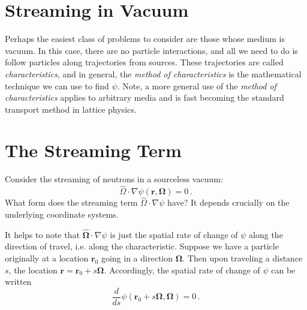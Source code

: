 \section*{Streaming in Vacuum}

Perhaps the easiest class of problems to consider are those whose medium is vacuum.  In this case, there are no particle interactions, and all we need to do is follow particles along trajectories from sources.  These trajectories are called \textit{characteristics}, and in general, the \textit{method of characteristics} is the mathematical technique we can use to find $\psi$.  Note, a more general use of the \textit{method of characteristics} applies to arbitrary media and is fast becoming the standard transport method in lattice physics.

\section*{The Streaming Term}

Consider the streaming of neutrons in a sourceless vacuum:
\begin{equation}
     \hat{\Omega} \cdot \nabla \psi(\mathbf{r},\mathbf{\Omega}) =   0  \, .
\end{equation}
What form does the streaming term $ \hat{\Omega} \cdot \nabla \psi $ have?  It depends crucially on the underlying coordinate systems.  

It helps to note that  $\mathbf{\hat{\Omega}} \cdot \nabla \psi$ is just the spatial rate of change of $\psi$ along the direction of travel, i.e. along the characteristic.  Suppose we have a particle originally at a location $\mathbf{r}_0$  going in a direction $\mathbf{\Omega}$.  Then upon traveling a distance $s$, the location $\mathbf{r} = \mathbf{r}_0 + s\mathbf{\Omega}$.  Accordingly, the spatial rate of change of $\psi$ can be written
\begin{equation}
    \frac{d}{ds} \psi(\mathbf{r}_0 +s\mathbf{\Omega},\mathbf{\Omega}) =   0  \, .
    \label{eq:spaceratepsi}
\end{equation}

